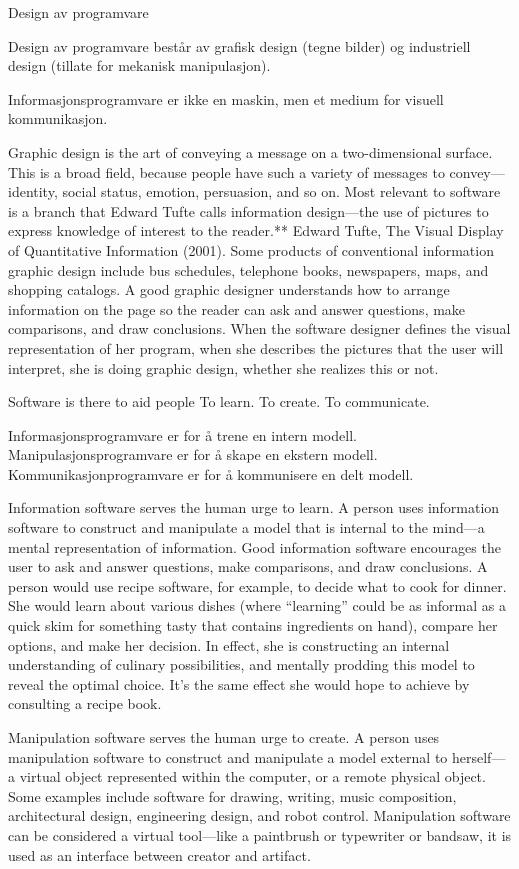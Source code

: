 {\color{blue}
Design av programvare

Design av programvare består av grafisk design (tegne bilder) og industriell design (tillate for mekanisk manipulasjon).

Informasjonsprogramvare er ikke en maskin, men et medium for visuell kommunikasjon.

Graphic design is the art of conveying a message on a two-dimensional surface. This is a broad field, because people have such a variety of messages to convey—identity, social status, emotion, persuasion, and so on. Most relevant to software is a branch that Edward Tufte calls information design—the use of pictures to express knowledge of interest to the reader.** Edward Tufte, The Visual Display of Quantitative Information (2001). Some products of conventional information graphic design include bus schedules, telephone books, newspapers, maps, and shopping catalogs. A good graphic designer understands how to arrange information on the page so the reader can ask and answer questions, make comparisons, and draw conclusions. When the software designer defines the visual representation of her program, when she describes the pictures that the user will interpret, she is doing graphic design, whether she realizes this or not.

Software is there to aid people
    To learn.
    To create.
    To communicate.

Informasjonsprogramvare er for å trene en intern modell. Manipulasjonsprogramvare er for å skape en ekstern modell. Kommunikasjonprogramvare er for å kommunisere en delt modell.

Information software serves the human urge to learn. A person uses information software to construct and manipulate a model that is internal to the mind—a mental representation of information. Good information software encourages the user to ask and answer questions, make comparisons, and draw conclusions. A person would use recipe software, for example, to decide what to cook for dinner. She would learn about various dishes (where “learning” could be as informal as a quick skim for something tasty that contains ingredients on hand), compare her options, and make her decision. In effect, she is constructing an internal understanding of culinary possibilities, and mentally prodding this model to reveal the optimal choice. It’s the same effect she would hope to achieve by consulting a recipe book.

Manipulation software serves the human urge to create. A person uses manipulation software to construct and manipulate a model external to herself—a virtual object represented within the computer, or a remote physical object. Some examples include software for drawing, writing, music composition, architectural design, engineering design, and robot control. Manipulation software can be considered a virtual tool—like a paintbrush or typewriter or bandsaw, it is used as an interface between creator and artifact.

}
